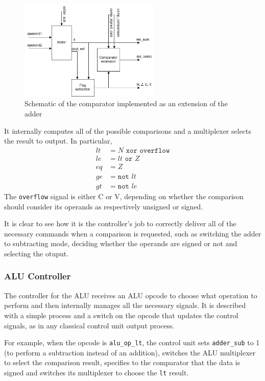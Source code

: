 \begin{figure}[htbp]
    \center
	\includegraphics[width=0.6\textwidth]{./2-implementation/images/comparator.png}
	\caption{Schematic of the comparator implemented as an extension of the adder}
	\label{fig:comparator}
\end{figure}

It internally computes all of the possible comparisons and a multiplexer selects the result to output. In particular,
\begin{align*}
    lt &= N \texttt{ xor } \texttt{overflow} \\
    le &= lt \texttt{ or } Z \\
    eq &= Z \\
    ge &= \texttt{not } lt \\
    gt &= \texttt{not } le
\end{align*}
The \texttt{overflow} signal is either C or V, depending on whether the comparison should consider its operands as
respectively unsigned or signed.

It is clear to see how it is the controller's job to correctly deliver all of the necessary commands when a comparison
is requested, such as switching the adder to subtracting mode, deciding whether the operands are signed or not and
selecting the otuput.

\subsubsection{ALU Controller}
The controller for the ALU receives an ALU opcode to choose what operation to perform and then internally manages all
the necessary signals. It is described with a simple process and a switch on the opcode that updates the control
signals, as in any classical control unit output process.

For example, when the opcode is \texttt{alu\_op\_lt}, the control unit sets \texttt{adder\_sub} to 1 (to perform a
subtraction instead of an addition), switches the ALU multiplexer to select the comparison result, specifies to the
comparator that the data is signed and switches its multiplexer to choose the \texttt{lt} result.

